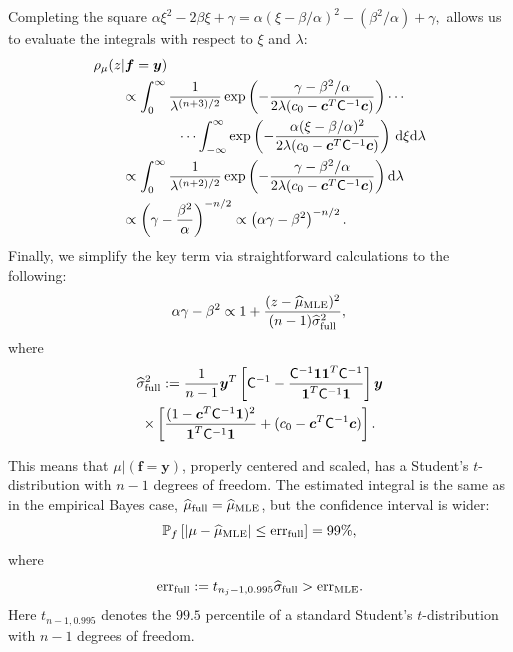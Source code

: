 \documentclass[twocolumn]{svjour3}          %
\newcommand{\bm}[1]{\boldsymbol{#1}}
\newcommand{\D}[1]{\text{d}{#1}}
\newcommand{\vc}{\bm{c}}
\newcommand{\vf}{\bm{f}}
\newcommand{\vy}{\bm{y}}
\newcommand{\vone}{\bm{1}}
\newcommand{\mC}{\mathsf{C}}
\newcommand{\hmu}{\widehat{\mu}}
\newcommand{\hsigma}{\widehat{\sigma}}
\newcommand{\MLE}{\textup{MLE}}
\newcommand{\err}{\textup{err}}
\begin{document}
Completing the square $
\alpha \xi^2 -2 \beta \xi + \gamma 
= \alpha (\xi -\beta/\alpha)^2  - (\beta^2/\alpha) + \gamma,
$
allows us to evaluate the integrals with respect to $\xi$ and $\lambda$:
\begin{align*}
\MoveEqLeft{\rho_{\mu}(z | \vf = \vy)} \\
& \propto \displaystyle \int_{0}^\infty  \frac{1}{\lambda^{(n+3)/2}}  \exp\left( -\frac{  \gamma - \beta^2/\alpha}{2\lambda(c_0  -\vc ^T \mC^{-1} \vc)} \right)  \cdots \\
& \qquad \qquad \cdots \int_{-\infty}^\infty  \exp\left( -\frac{\alpha (\xi -\beta/\alpha)^2}{2\lambda(c_0  -\vc ^T \mC^{-1} \vc)} \right) \, \D \xi \D \lambda \\
& \propto \displaystyle \int_{0}^\infty  \frac{1}{\lambda^{(n+2)/2}}  \exp\left( -\frac{  \gamma - \beta^2/\alpha}{2\lambda(c_0  -\vc ^T \mC^{-1} \vc)} \right) \D \lambda \\
& \propto \left(\gamma - \frac{\beta^2}{\alpha}\right)^{-n/2} \propto \left(\alpha \gamma - \beta^2\right)^{-n/2}.
\end{align*}
Finally, we simplify the key term via straightforward calculations to the following:
\begin{equation*}
\alpha \gamma - \beta^2 \propto 1 +  \frac{(z - \hmu_{\textup{MLE}})^2}{(n-1)\widehat{\sigma}_{\textup{full}}^2}, \\
\end{equation*}
where 
\begin{multline*}
\hsigma^2_{\textup{full}} 
:= \frac{1}{n-1}
\vy^T\left[ \mC^{-1} 
- \frac{ \mC^{-1} \vone\vone^T \mC^{-1}}{\vone^T \mC^{-1} \vone}  \right]\vy
\\ 
\times  \left[\frac{(1 - \vc^T \mC^{-1} \vone)^2}{\vone^T \mC^{-1} \vone} + (c_0  -\vc ^T \mC^{-1} \vc) \right].
\end{multline*}

This means that $\mu \vert (\vf = \vy )$, properly centered and scaled, has a Student's $t$-distribution with $n-1$ degrees of freedom.   The estimated integral is the same as in the empirical Bayes case, $\hmu_{\textup{full}} = \hmu_{\MLE}$, but the confidence interval is wider:
\begin{equation}
\label{eqn_prob_CI_full}
\mathbb{P}_f \left[
|\mu-\hmu_\MLE| \leq \err_{\textup{full}} \right]  = 99\%,
\end{equation}
where
\begin{equation}
\label{FJH:eq:errFull}
\err_{\textup{full}} 
:= t_{n_j-1,0.995} \hsigma_{\textup{full}} > \err_\MLE .
\end{equation}
Here $t_{n-1,0.995}$ denotes the $99.5$ percentile of a standard Student's $t$-distribution with $n-1$ degrees of freedom.
\end{document}

